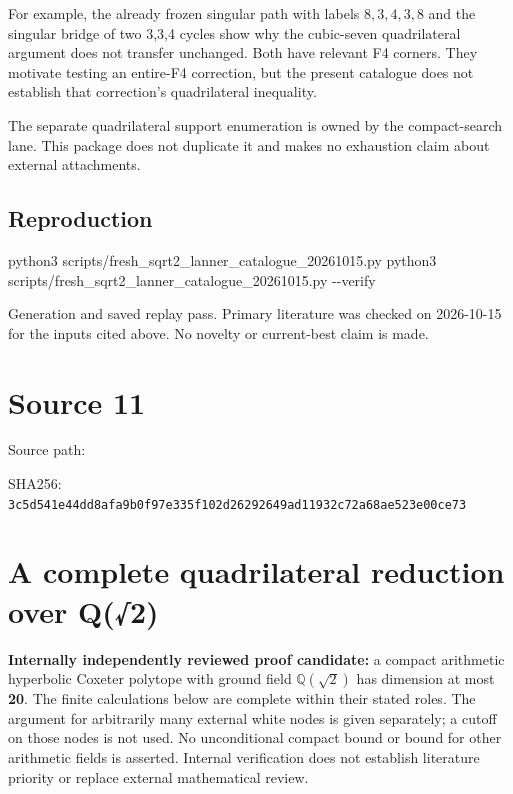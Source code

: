 \documentclass[
  10pt,
]{report}
\newenvironment{Shaded}{}{}
\newcommand{\AttributeTok}[1]{\textcolor[rgb]{0.49,0.56,0.16}{#1}}
\newcommand{\ExtensionTok}[1]{#1}
\newcommand{\NormalTok}[1]{#1}
\begin{document}
For example, the already frozen singular path with labels \(8,3,4,3,8\)
and the singular bridge of two 3,3,4 cycles show why the cubic-seven
quadrilateral argument does not transfer unchanged. Both have relevant
F4 corners. They motivate testing an entire-F4 correction, but the
present catalogue does not establish that correction's quadrilateral
inequality.

The separate quadrilateral support enumeration is owned by the
compact-search lane. This package does not duplicate it and makes no
exhaustion claim about external attachments.

\section{Reproduction}\label{reproduction}

\begin{Shaded}
\begin{Highlighting}[]
\ExtensionTok{python3}\NormalTok{ scripts/fresh\_sqrt2\_lanner\_catalogue\_20261015.py}
\ExtensionTok{python3}\NormalTok{ scripts/fresh\_sqrt2\_lanner\_catalogue\_20261015.py }\AttributeTok{{-}{-}verify}
\end{Highlighting}
\end{Shaded}

Generation and saved replay pass. Primary literature was checked on
2026-10-15 for the inputs cited above. No novelty or current-best claim
is made.

\clearpage

\chapter{Source 11}\label{source-11}

Source path: 

SHA256:
\nolinkurl{3c5d541e44dd8afa9b0f97e335f102d26292649ad11932c72a68ae523e00ce73}

\chapter{A complete quadrilateral reduction over
Q(√2)}\label{a-complete-quadrilateral-reduction-over-q2}

\textbf{Internally independently reviewed proof candidate:} a compact
arithmetic hyperbolic Coxeter polytope with ground field
\(\mathbb Q(\sqrt2)\) has dimension at most \textbf{20}. The finite
calculations below are complete within their stated roles. The argument
for arbitrarily many external white nodes is given separately; a cutoff
on those nodes is not used. No unconditional compact bound or bound for
other arithmetic fields is asserted. Internal verification does not
establish literature priority or replace external mathematical review.
\end{document}
